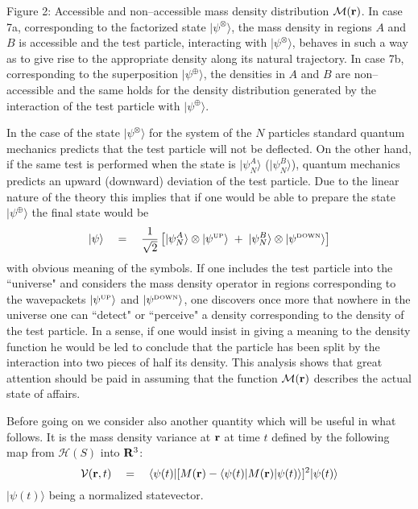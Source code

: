 \documentclass[12pt]{article}
\begin{document}
\begin{center}
\vspace{0.2cm} \footnotesize \parbox{4.8in}{Figure 2: Accessible
and non--accessible mass density distribution ${\mathcal M}({\bf
r})$. In case 7a, corresponding to the factorized state
$|\psi^{\otimes}\rangle$, the mass density in regions $A$ and $B$
is accessible and the test particle, interacting with
$|\psi^{\otimes}\rangle$, behaves in such a way as to give rise to
the appropriate density along its natural trajectory. In case 7b,
corresponding to the superposition $|\psi^{\oplus}\rangle$, the
densities in $A$ and $B$ are non--accessible and the same holds
for the density distribution generated by the interaction of the
test particle with $|\psi^{\oplus}\rangle$.} \normalsize
\end{center} \vspace{0.5cm}
In the case of the state $|\psi^{\otimes}\rangle$  for the system
of the $N$ particles  standard quantum mechanics predicts that the test
particle will not be deflected. On the other hand, if the same
test is performed when the state is $|\psi^{A}_{N}\rangle$
($|\psi^{B}_{N}\rangle$), quantum mechanics predicts an upward
(downward) deviation of the test particle. Due to the linear
nature of the theory this implies that if one would be able to
prepare the state  $|\psi^{\oplus}\rangle$ the final state would
be
\begin{equation} \label{edcvf}
|\psi\rangle \quad = \quad \frac{1}{\sqrt{2}} \left[
|\psi^{A}_{N}\rangle \otimes |\psi^{\makebox{\tiny UP}}\rangle \;
+ \; |\psi^{B}_{N}\rangle \otimes |\psi^{\makebox{\tiny
DOWN}}\rangle \right]
\end{equation}
with obvious meaning of the symbols. If one includes the test
particle into the ``universe" and considers the mass density
operator in regions corresponding to the wavepackets
$|\psi^{\makebox{\tiny UP}}\rangle$  and $|\psi^{\makebox{\tiny
DOWN}}\rangle$, one discovers once more that nowhere in the
universe one can ``detect" or ``perceive" a density corresponding
to the density of the test particle. In a sense, if one would
insist in giving a meaning to the density function he would be led
to conclude that the particle has been split by the interaction
into two pieces of half its density. This analysis shows that
great attention should be paid in assuming that the function
${\mathcal M}({\bf r})$ describes the actual state of affairs.

Before going on we consider also another quantity which will be
useful in what follows. It is the mass density variance at ${\bf
r}$ at time $t$ defined by the following map from ${\mathcal
H}(S)$ into ${\bf R}^{3}$:
\begin{equation}
{\mathcal V}({\bf r}, t) \quad = \quad \langle \psi(t)|[ M({\bf
r}) - \langle \psi(t)| M({\bf r}) | \psi(t) \rangle]^{2}
|\psi(t)\rangle
\end{equation}
$|\psi(t)\rangle$ being a normalized statevector.
\end{document}
